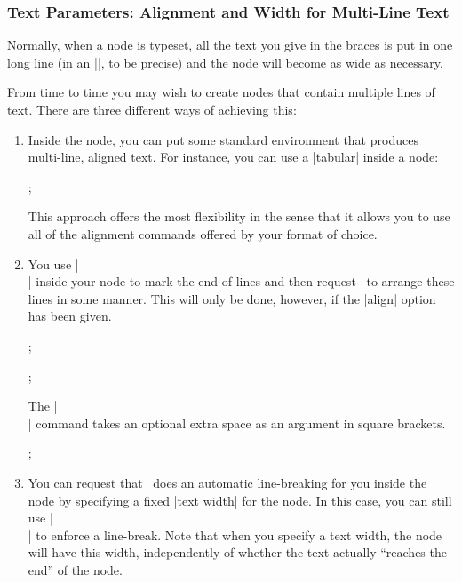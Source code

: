 \subsubsection{Text Parameters: Alignment and Width for Multi-Line Text}

Normally, when a node is typeset, all the text you give in the braces is put in
one long line (in an |\hbox|, to be precise) and the node will become as wide
as necessary.

From time to time you may wish to create nodes that contain multiple lines of
text. There are three different ways of achieving this:
%
\begin{enumerate}
    \item Inside the node, you can put some standard environment that produces
        multi-line, aligned text. For instance, you can use a |{tabular}|
        inside a node:
\begin{codeexample}[width=5cm]
\tikz {};
\end{codeexample}
        This approach offers the most flexibility in the sense that it allows
        you to use all of the alignment commands offered by your format of
        choice.
    \item You use |\\| inside your node to mark the end of lines and then
        request \tikzname\ to arrange these lines in some manner. This will
        only be done, however, if the |align| option has been given.
\begin{codeexample}[]
\tikz[align=left] ;
\end{codeexample}
\begin{codeexample}[]
\tikz[align=center] ;
\end{codeexample}
        The |\\| command takes an optional extra space as an argument in square
        brackets.
\begin{codeexample}[]
\tikz {};
\end{codeexample}
    \item You can request that \tikzname\ does an automatic line-breaking for
        you inside the node by specifying a fixed |text width| for the node. In
        this case, you can still use |\\| to enforce a line-break. Note that
        when you specify a text width, the node will have this width,
        independently of whether the text actually ``reaches the end'' of the
        node.
\end{enumerate}

